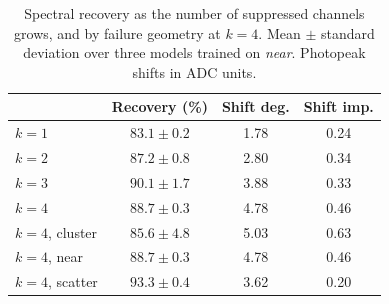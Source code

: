 \documentclass[10pt,conference]{IEEEtran}
\begin{document}
\begin{table}[t]
\centering
\caption{Spectral recovery as the number of suppressed channels grows, and by
failure geometry at $k=4$. Mean $\pm$ standard deviation over three models
trained on \emph{near}. Photopeak shifts in ADC units.}
\label{tab:espectro-k}
\begin{tabular}{@{}lccc@{}}
\toprule
& \textbf{Recovery (\%)} & \textbf{Shift deg.} & \textbf{Shift imp.} \\
\midrule
$k=1$ & $83.1 \pm 0.2$ & 1.78 & 0.24 \\
$k=2$ & $87.2 \pm 0.8$ & 2.80 & 0.34 \\
$k=3$ & $90.1 \pm 1.7$ & 3.88 & 0.33 \\
$k=4$ & $88.7 \pm 0.3$ & 4.78 & 0.46 \\
\midrule
$k=4$, cluster & $85.6 \pm 4.8$ & 5.03 & 0.63 \\
$k=4$, near    & $88.7 \pm 0.3$ & 4.78 & 0.46 \\
$k=4$, scatter & $93.3 \pm 0.4$ & 3.62 & 0.20 \\
\bottomrule
\end{tabular}
\end{table}

%
%
\end{document}
